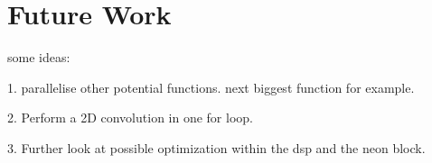 \section{Future Work}

some ideas:

1. parallelise other potential functions. next biggest function for example.


2. Perform a 2D convolution in one for loop.

3. Further look at possible optimization within the dsp and the neon block. 

